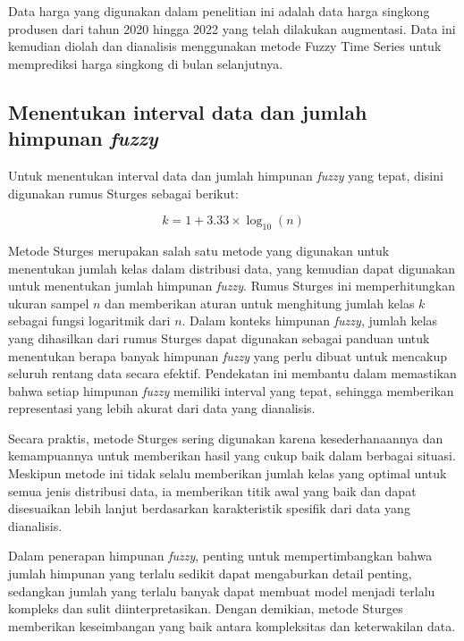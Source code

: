 \documentclass[conference]{IEEEtran}
\begin{document}
Data harga yang digunakan dalam penelitian ini adalah data harga singkong produsen dari tahun 2020 hingga 2022 yang telah dilakukan augmentasi. Data ini kemudian diolah dan dianalisis menggunakan metode Fuzzy Time Series untuk memprediksi harga singkong di bulan selanjutnya.

\subsection{Menentukan interval data dan jumlah himpunan \textit{fuzzy}}\label{AA}
Untuk menentukan interval data dan jumlah himpunan \textit{fuzzy} yang tepat, disini digunakan rumus Sturges sebagai berikut:

\begin{equation}
    k = 1 + 3.33 \times \log_{10}(n)
\end{equation}

Metode Sturges merupakan salah satu metode yang digunakan untuk menentukan jumlah kelas dalam distribusi data, yang kemudian dapat digunakan untuk menentukan jumlah himpunan \textit{fuzzy}. Rumus Sturges ini memperhitungkan ukuran sampel \( n \) dan memberikan aturan untuk menghitung jumlah kelas \( k \) sebagai fungsi logaritmik dari \( n \). Dalam konteks himpunan \textit{fuzzy}, jumlah kelas yang dihasilkan dari rumus Sturges dapat digunakan sebagai panduan untuk menentukan berapa banyak himpunan \textit{fuzzy} yang perlu dibuat untuk mencakup seluruh rentang data secara efektif. Pendekatan ini membantu dalam memastikan bahwa setiap himpunan \textit{fuzzy} memiliki interval yang tepat, sehingga memberikan representasi yang lebih akurat dari data yang dianalisis.

Secara praktis, metode Sturges sering digunakan karena kesederhanaannya dan kemampuannya untuk memberikan hasil yang cukup baik dalam berbagai situasi. Meskipun metode ini tidak selalu memberikan jumlah kelas yang optimal untuk semua jenis distribusi data, ia memberikan titik awal yang baik dan dapat disesuaikan lebih lanjut berdasarkan karakteristik spesifik dari data yang dianalisis. 

Dalam penerapan himpunan \textit{fuzzy}, penting untuk mempertimbangkan bahwa jumlah himpunan yang terlalu sedikit dapat mengaburkan detail penting, sedangkan jumlah yang terlalu banyak dapat membuat model menjadi terlalu kompleks dan sulit diinterpretasikan. Dengan demikian, metode Sturges memberikan keseimbangan yang baik antara kompleksitas dan keterwakilan data.
\end{document}
